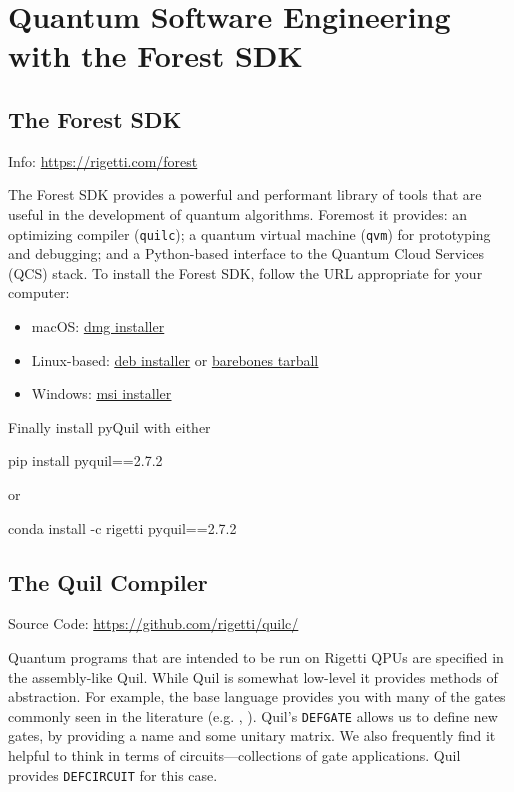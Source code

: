 \section{Quantum Software Engineering with the Forest SDK}

\subsection{The Forest SDK}

\begin{center}
Info: \url{https://rigetti.com/forest}
\end{center}

The Forest SDK provides a powerful and performant library of tools that are useful in the development of quantum algorithms. Foremost it provides: an optimizing compiler (\verb|quilc|); a quantum virtual machine (\verb|qvm|) for prototyping and debugging; and a Python-based interface to the Quantum Cloud Services (QCS) stack. To install the Forest SDK, follow the URL appropriate for your computer:
\begin{itemize}
    \item macOS: \href{https://downloads.rigetti.com/qcs-sdk/forest-sdk.dmg}{\underline{dmg installer}}
    \item Linux-based: \href{https://downloads.rigetti.com/qcs-sdk/forest-sdk-linux-deb.tar.bz2}{\underline{deb installer}} or \href{https://downloads.rigetti.com/qcs-sdk/forest-sdk-linux-barebones.tar.bz2}{\underline{barebones tarball}}
    \item Windows: \href{https://downloads.rigetti.com/qcs-sdk/forest-sdk.msi}{\underline{msi installer}}
\end{itemize}
Finally install pyQuil with either
\begin{bash}
pip install pyquil==2.7.2
\end{bash}
or
\begin{bash}
conda install -c rigetti pyquil==2.7.2
\end{bash}

\subsection{The Quil Compiler}
\begin{center}
Source Code: \url{https://github.com/rigetti/quilc/}
\end{center}

Quantum programs that are intended to be run on Rigetti QPUs are specified in the assembly-like Quil. While Quil is somewhat low-level it provides methods of abstraction. For example, the base language provides you with many of the gates commonly seen in the literature (e.g. \Hadamard{}, \CNOT{}). Quil's \verb|DEFGATE| allows us to define new gates, by providing a name and some unitary matrix. We also frequently find it helpful to think in terms of circuits---collections of gate applications. Quil provides \verb|DEFCIRCUIT| for this case.

